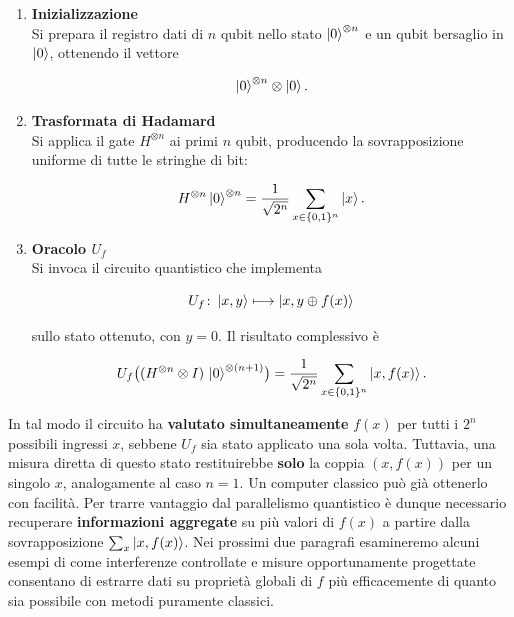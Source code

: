 \documentclass[a4paper,12pt]{report}
\theoremstyle{plain}
\begin{document}
\begin{enumerate}
    \item \textbf{Inizializzazione} \\
    Si prepara il registro dati di $n$ qubit nello stato $\ket{0}^{\otimes n}$ e un qubit bersaglio in $\ket{0}$, ottenendo il vettore
    
    \[
      \ket{0}^{\otimes n} \otimes \ket{0}.
    \]
    
    \item \textbf{Trasformata di Hadamard} \\
    Si applica il gate $H^{\otimes n}$ ai primi $n$ qubit, producendo la sovrapposizione uniforme di tutte le stringhe di bit:
    
    \[
      H^{\otimes n} \ket{0}^{\otimes n}
      = \frac{1}{\sqrt{2^n}} \sum_{x \in \{0,1\}^n} \ket{x}.
    \]
    
    \item \textbf{Oracolo $U_f$} \\
    Si invoca il circuito quantistico che implementa
    
    \[
      U_f\colon \ket{x,y} \longmapsto \ket{x, y \oplus f(x)}
    \]
    
    sullo stato ottenuto, con $y=0$. Il risultato complessivo è
    
    \begin{equation}
      U_f \bigl( (H^{\otimes n} \otimes I) \, \ket{0}^{\otimes (n+1)} \bigr)
      = 
      \frac{1}{\sqrt{2^n}}
      \sum_{x \in \{0,1\}^n} \ket{x, f(x)}.
    \end{equation}
\end{enumerate}
In tal modo il circuito ha \textbf{valutato simultaneamente} $f(x)$ per tutti i $2^n$ possibili ingressi $x$, sebbene $U_f$ sia stato applicato una sola volta. Tuttavia, una misura diretta di questo stato restituirebbe \textbf{solo} la coppia $(x,f(x))$ per un singolo $x$, analogamente al caso $n=1$. Un computer classico può già ottenerlo con facilità.
Per trarre vantaggio dal parallelismo quantistico è dunque necessario recuperare \textbf{informazioni aggregate} su più valori di $f(x)$ a partire dalla sovrapposizione $\sum_x \ket{x, f(x)}$. Nei prossimi due paragrafi esamineremo alcuni esempi di come interferenze controllate e misure opportunamente progettate consentano di estrarre dati su proprietà globali di $f$ più efficacemente di quanto sia possibile con metodi puramente classici.
\end{document}
